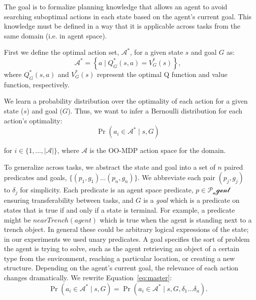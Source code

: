 \documentclass[11pt]{article}
\begin{document}
The goal is to formalize planning knowledge that allows an agent to
avoid searching suboptimal actions in each state based on the agent's
current goal. This knowledge must be defined in a way that it is applicable across tasks from the same domain (i.e. in agent space).

First we define the optimal action set, $\mathcal{A}^*$, for a
given state $s$ and goal $G$ as:
\begin{equation}
\mathcal{A}^* = \left\{ a \mid Q^*_G(s,a) = V^*_G(s) \right\}, 
\label{eq:opt_act_set}
\end{equation}
where $Q^*_G(s,a)$ and $V^*_G(s)$ represent the optimal Q function and 
value function, respectively.

We learn a probability distribution over the optimality of each action
for a given state ($s$) and goal ($G$). Thus, we want to infer a Bernoulli
distribution for each action's optimality:
\begin{equation}
\Pr(a_i \in \mathcal{A}^* \mid s, G)
\label{eq:master}
\end{equation}

\noindent for $i \in \{1, \ldots, |\mathcal{A}|\}$, where
$\mathcal{A}$ is the OO-MDP action space for the domain.

To generalize across tasks, we abstract the state
and goal into a set of $n$ paired predicates and goals, $\{
(p_1, g_1) \ldots (p_{n}, g_{n}) \}$. We abbreviate each pair $(p_j,
g_j)$ to $\delta_j$ for simplicity. Each predicate is an agent space predicate, $p \in
\mathcal{P_agent}$ ensuring transferability between tasks, and $G$ is a {\it goal} which is a
predicate on states that is true if and only if a state is terminal. For example, a
predicate might be $nearTrench(agent)$ which is true when the agent is
standing next to a trench object.  In general these could be arbitrary
logical expressions of the state; in our experiments we used unary
predicates. A goal specifies the sort of problem the agent is trying to solve, such as the agent
retrieving an object of a certain type from the environment, reaching
a particular location, or creating a new structure.  Depending on the
agent's current goal, the relevance of each action changes
dramatically.  We rewrite Equation~\ref{eq:master}:
\begin{equation}
\Pr(a_i \in \mathcal{A}^* \mid s, G) = \Pr(a_i \in \mathcal{A}^* \mid s, G, \delta_1 \ldots \delta_n).
\end{equation}
\end{document}
